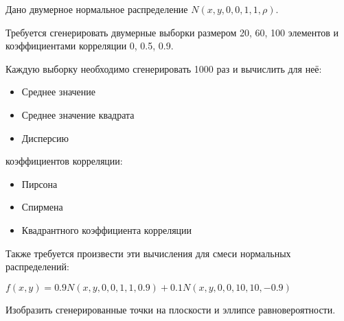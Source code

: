 \item Дано двумерное нормальное распределение $N(x, y, 0, 0, 1, 1, \rho)$.

Требуется сгенерировать двумерные выборки размером 20, 60, 100 элементов и коэффициентами корреляции 0, 0.5, 0.9.

Каждую выборку необходимо сгенерировать 1000 раз и вычислить для неё:
\begin{itemize}
	\item Среднее значение
	\item Среднее значение квадрата
	\item Дисперсию
\end{itemize}
коэффициентов корреляции:
\begin{itemize}
	\item Пирсона
	\item Спирмена
	\item Квадрантного коэффициента корреляции
\end{itemize}

Также требуется произвести эти вычисления для смеси нормальных распределений:

$f(x, y) = 0.9N(x, y, 0, 0, 1, 1, 0.9) + 0.1N(x, y, 0, 0, 10, 10, -0.9)$

Изобразить сгенерированные точки на плоскости и эллипсе равновероятности.	